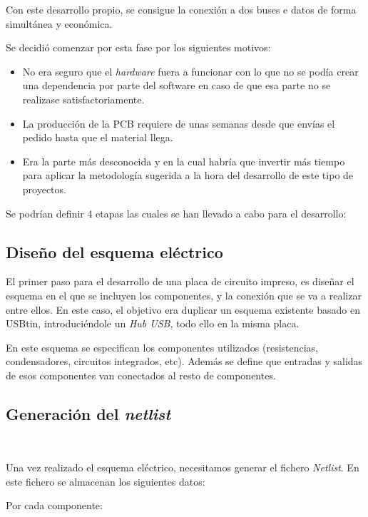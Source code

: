 Con este desarrollo propio, se consigue la conexión a dos buses e datos de forma simultánea y económica.

Se decidió comenzar por esta fase por los siguientes motivos:

\begin{itemize}
\item
No era seguro que el \emph{hardware} fuera a funcionar con lo que no se podía crear una dependencia por parte del software en caso de que esa parte no se realizase satisfactoriamente.

\item
La producción de la PCB requiere de unas semanas desde que envías el pedido hasta que el material llega.
\item
Era la parte más desconocida y en la cual habría que invertir más tiempo para aplicar la metodología sugerida a la hora del desarrollo de este tipo de proyectos.
\end{itemize}

Se podrían definir 4 etapas las cuales se han llevado a cabo para el desarrollo:

\subsection{Diseño del esquema eléctrico}\label{diseño_del_esquema_electrico}

El primer paso para el desarrollo de una placa de circuito impreso, es diseñar el esquema en el que se incluyen los componentes, y la conexión que se va a realizar entre ellos. En este caso, el objetivo era duplicar un esquema existente basado en USBtin\cite{usbtin}, introduciéndole un \emph{Hub USB}\cite{hubusb}, todo ello en la misma placa.


En este esquema se especifican los componentes utilizados (resistencias, condensadores, circuitos integrados, etc). Además se define que entradas y salidas de esos componentes van conectados al resto de componentes.


\subsection{Generación del \emph{netlist}}\

Una vez realizado el esquema eléctrico, necesitamos generar el fichero \emph{Netlist}. En este fichero se almacenan los siguientes datos:

Por cada componente:


